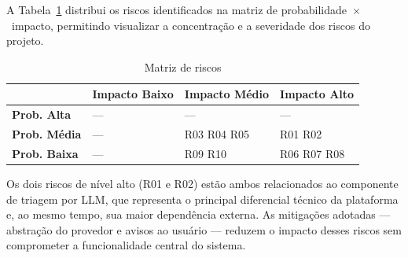 A Tabela~\ref{tab:risk-matrix} distribui os riscos
identificados na matriz de probabilidade~$\times$~impacto,
permitindo visualizar a concentração e a severidade
dos riscos do projeto.

\begin{table}[H]
  \centering
  \caption{Matriz de riscos}
  \label{tab:risk-matrix}
  \begin{tabular}{p{1.8cm}
                  >{\centering\arraybackslash}p{3.5cm}
                  >{\centering\arraybackslash}p{3.5cm}
                  >{\centering\arraybackslash}p{3.5cm}}
    \toprule
    &
    \textbf{Impacto Baixo} &
    \textbf{Impacto Médio} &
    \textbf{Impacto Alto} \\
    \midrule
    \textbf{Prob. Alta}
      & \cellcolor{warning!30} ---
      & \cellcolor{danger!35} ---
      & \cellcolor{danger!35} --- \\[18pt]
    \textbf{Prob. Média}
      & \cellcolor{success!25} ---
      & \cellcolor{warning!30} R03 \quad R04 \quad R05
      & \cellcolor{danger!35} R01 \quad R02 \\[18pt]
    \textbf{Prob. Baixa}
      & \cellcolor{success!25} ---
      & \cellcolor{success!25} R09 \quad R10
      & \cellcolor{warning!30} R06 \quad R07 \quad R08 \\[18pt]
    \bottomrule
  \end{tabular}
\end{table}

Os dois riscos de nível alto (R01 e R02) estão ambos
relacionados ao componente de triagem por LLM, que
representa o principal diferencial técnico da
plataforma e, ao mesmo tempo, sua maior dependência
externa. As mitigações adotadas — abstração do
provedor e avisos ao usuário — reduzem o impacto
desses riscos sem comprometer a funcionalidade
central do sistema.
